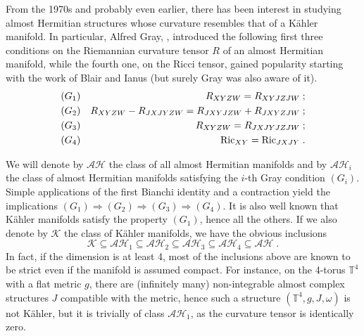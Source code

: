 \documentclass{amsart}
\begin{document}
From the 1970s and probably even earlier, there has been interest in studying almost Hermitian structures whose curvature resembles that of a K\"ahler manifold. In particular, Alfred Gray, \cite{Gr}, introduced the following first three conditions on the Riemannian curvature tensor $R$ of an almost Hermitian manifold, while the fourth one, on the Ricci tensor, gained popularity starting with the work of Blair and Ianus \cite{BI} (but surely Gray was also aware of it).
\begin{eqnarray} \nonumber
(G_1) & & R_{XYZW} = R_{XYJZJW} \; ; \\ \nonumber
(G_2) & & R_{XYZW} - R_{JXJYZW} = R_{JXYJZW} + R_{JXYZJW} \; ; \\ \nonumber
(G_3) & & R_{XYZW} = R_{JXJYJZJW} \; ; \\ \nonumber  
(G_4) & & {\rm Ric}_{XY} = {\rm Ric}_{JXJY} \; .
\end{eqnarray}

We will denote by $\mathcal{AH}$ the class of all almost Hermitian manifolds and by $\mathcal{AH}_{i}$ the class of almost Hermitian manifolds satisfying the $i$-th Gray condition $(G_i)$. Simple applications of the first Bianchi identity and a contraction yield the implications $(G_1) \Rightarrow (G_2) \Rightarrow (G_3) \Rightarrow (G_4)$. It is also well known that K\"ahler manifolds satisfy the property $(G_1)$, hence all the others. If we also denote by $\mathcal{K}$ the class of K\"ahler manifolds, we have the obvious inclusions
$$ \mathcal{K}  \subseteq \mathcal{AH}_1 \subseteq \mathcal{AH}_2 \subseteq \mathcal{AH}_3 \subseteq \mathcal{AH}_4 \subseteq  \mathcal{AH}\; .$$
In fact, if the dimension is at least 4, most of the inclusions above are known to be strict even if the manifold is assumed compact. For instance, on the 4-torus $\mathbb{T}^4$ with a flat metric $g$, there are (infinitely many) non-integrable almost complex structures $J$ compatible with the metric, hence such a structure $(\mathbb{T}^4,g,J,\omega)$ is not K\"ahler, but it is trivially of class $\mathcal{AH}_{1}$, as the curvature tensor is identically zero. 
\end{document}
